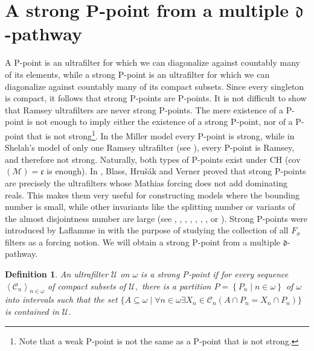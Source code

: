 \documentclass{article}%
\newtheorem{definition}[theorem]{Definition}
\begin{document}
\section{A strong P-point from a multiple $\mathfrak{d}$-pathway
\label{strong Ppoint}}

A \textsf{P}-point is an ultrafilter for which we can diagonalize against
countably many of its elements, while a strong \textsf{P}-point is an
ultrafilter for which we can diagonalize against countably many of its compact
subsets. Since every singleton is compact, it follows that strong
\textsf{P}-points are \textsf{P}-points. It is not difficult to show that
Ramsey ultrafilters are never strong \textsf{P}-points. The mere existence of
a \textsf{P}-point is not enough to imply either the existence of a strong
\textsf{P}-point, nor of a \textsf{P}-point that is not strong\footnote{Note
that a weak \textsf{P}-point is not the same as a \textsf{P}-point that is not
strong.}. In the Miller model every \textsf{P}-point is strong, while in
Shelah's model of only one Ramsey ultrafilter (see \cite{ProperandImproper}),
every \textsf{P}-point is Ramsey, and therefore not strong. Naturally, both
types of \textsf{P}-points exist under \textsf{CH }(\textsf{cov}$\left(
\mathcal{M}\right)  =\mathfrak{c}$ is enough). In \cite{HrusakVerner}, Blass,
Hru\v{s}\'{a}k and Verner proved that strong \textsf{P}-points are precisely
the ultrafilters whose Mathias forcing does not add dominating reals. This
makes them very useful for constructing models where the bounding number is
small, while other invariants like the splitting number or variants of the
almost disjointness number are large (see \cite{BrendleRaghavan},
\cite{OnCardinalInvariantsoftheContinuum}, \cite{ProperandImproper},
\cite{TotallyMAD}, \cite{MadFamiliesSplittingFamiliesandLargeContinuum},
\cite{MobandMAD}, \cite{CanjarFilters}, \cite{CanjarFiltersII} or
\cite{uanda}). Strong \textsf{P}-points were introduced by Laflamme in
\cite{LaflammeCompleteCombinatorics} with the purpose of studying the
collection of all $F_{\sigma}$ filters as a forcing notion. We will obtain a
strong \textsf{P}-point from a multiple $\mathfrak{d}$-pathway.

\begin{definition}
An ultrafilter $\mathcal{U}$ on $\omega$ is a \emph{strong P-point} if for
every sequence $\left\langle \mathcal{C}_{n}\right\rangle _{n\in\omega}$ of
compact subsets of $\mathcal{U},$ there is a partition $P=\left\{  P_{n}\mid
n\in\omega\right\}  $ of $\omega$ into intervals such that the set
$\{A\subseteq\omega\mid\forall n\in\omega\exists X_{n}\in\mathcal{C}%
_{n}\left(  A\cap P_{n}=X_{n}\cap P_{n}\right)  \}$ is contained in
$\mathcal{U}.$
\end{definition}
\end{document}

